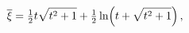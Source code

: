 \[\overline{\xi}=\tfrac{1}{2}t\sqrt{t^{2}+1}+\tfrac{1}{2}\mathop{\ln\/}\nolimits%
\!\left(t+\sqrt{t^{2}+1}\right),\]